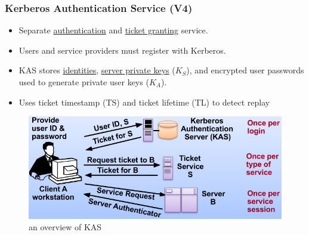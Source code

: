 \documentclass[twocolumn,landscape,10pt]{article}
\theoremstyle{definition}
\begin{document}
\subsubsection{Kerberos Authentication Service (V4)}

\begin{itemize}
    \item Separate \underline{authentication} and \underline{ticket granting}
        service.
    \item Users and service providers must register with Kerberos.
    \item KAS stores \underline{identities}, \underline{server private keys}
        ($K_S$), and encrypted user passwords used to generate private
        user keys ($K_A$).
    \item Uses ticket timestamp (TS) and ticket lifetime (TL) to detect replay
\end{itemize} 

\begin{figure}[h]
  	\includegraphics[scale=0.35]{KAS.png}
  	\centering
  	\caption{an overview of KAS}
\end{figure}

\end{document}
